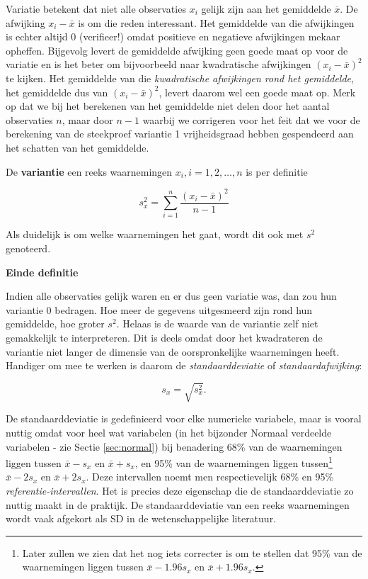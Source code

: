 \documentclass[12pt,dutch,coursenotes]{book}
\let\rmarkdownfootnote\footnote%
\def\footnote{\protect\rmarkdownfootnote}
\theoremstyle{definition}
\theoremstyle{definition}
\theoremstyle{definition}
\theoremstyle{remark}
\let\BeginKnitrBlock\begin \let\EndKnitrBlock\end
\begin{document}
Variatie betekent dat niet alle observaties \(x_i\) gelijk zijn aan het
gemiddelde \(\overline{x}\). De afwijking \(x_i - \bar{x}\) is om die
reden interessant. Het gemiddelde van die afwijkingen is echter altijd 0
(verifieer!) omdat positieve en negatieve afwijkingen mekaar opheffen.
Bijgevolg levert de gemiddelde afwijking geen goede maat op voor de
variatie en is het beter om bijvoorbeeld naar kwadratische afwijkingen
\((x_i - \bar{x})^2\) te kijken. Het gemiddelde van die
\emph{kwadratische afwijkingen rond het gemiddelde}, het gemiddelde dus
van \((x_i - \bar{x})^2\), levert daarom wel een goede maat op. Merk op
dat we bij het berekenen van het gemiddelde niet delen door het aantal
observaties \(n\), maar door \(n-1\) waarbij we corrigeren voor het feit
dat we voor de berekening van de steekproef variantie 1 vrijheidsgraad
hebben gespendeerd aan het schatten van het gemiddelde.

\BeginKnitrBlock{definition}[variantie]
\protect\hypertarget{def:unnamed-chunk-45}{}{\label{def:unnamed-chunk-45}
\iffalse (variantie) \fi{} }De \textbf{variantie} een reeks waarnemingen
\(x_i, i=1, 2, \dots, n\) is per definitie

\begin{equation*}
s^2_x = \sum_{i=1}^{n} \frac{(x_i - \bar{x})^2}{n-1}
\end{equation*}

Als duidelijk is om welke waarnemingen het gaat, wordt dit ook met
\(s^2\) genoteerd.

\textbf{Einde definitie}
\EndKnitrBlock{definition}

Indien alle observaties gelijk waren en er dus geen variatie was, dan
zou hun variantie 0 bedragen. Hoe meer de gegevens uitgesmeerd zijn rond
hun gemiddelde, hoe groter \(s^2\). Helaas is de waarde van de variantie
zelf niet gemakkelijk te interpreteren. Dit is deels omdat door het
kwadrateren de variantie niet langer de dimensie van de oorspronkelijke
waarnemingen heeft. Handiger om mee te werken is daarom de
\emph{standaarddeviatie} of \emph{ standaardafwijking}:

\begin{equation*}
s_x= \sqrt{s_x^2} .
\end{equation*}

De standaarddeviatie is gedefinieerd voor elke numerieke variabele, maar
is vooral nuttig omdat voor heel wat variabelen (in het bijzonder
Normaal verdeelde variabelen - zie Sectie \ref{sec:normal}) bij
benadering 68\% van de waarnemingen liggen tussen \(\bar{x} - s_x\) en
\(\bar{x} + s_x\), en 95\% van de waarnemingen liggen tussen\footnote{Later
  zullen we zien dat het nog iets correcter is om te stellen dat 95\%
  van de waarnemingen liggen tussen \(\bar{x} - 1.96 s_x\) en
  \(\bar{x} + 1.96 s_x\).} \(\bar{x} - 2 s_x\) en \(\bar{x} + 2 s_x\).
Deze intervallen noemt men respectievelijk 68\% en 95\%
\emph{referentie-intervallen}. Het is precies deze eigenschap die de
standaarddeviatie zo nuttig maakt in de praktijk. De standaarddeviatie
van een reeks waarnemingen wordt vaak afgekort als SD in de
wetenschappelijke literatuur.
\end{document}
